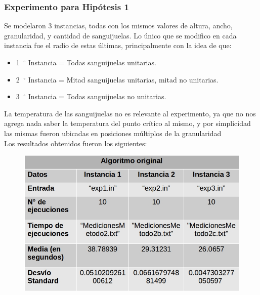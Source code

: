 \subsubsection{Experimento para Hipótesis 1}
Se modelaron 3 instancias, todas con los mismos valores de altura, ancho, granularidad, y cantidad de sanguijuelas. Lo único que se modifico en cada instancia fue el radio de estas últimas, principalmente con la idea de que:
 \begin{itemize}
    \item 1\hspace{-1.5mm}$\phantom{a}^{\circ}$ Instancia = Todas sanguijuelas unitarias.
    \item 2\hspace{-1.5mm}$\phantom{a}^{\circ}$ Instancia = Mitad sanguijuelas unitarias, mitad no unitarias.
    \item 3\hspace{-1.5mm}$\phantom{a}^{\circ}$ Instancia  = Todas sanguijuelas no unitarias.
 \end{itemize}
 La temperatura de las sanguijuelas no es relevante al experimento, ya que no nos agrega nada saber la temperatura del punto crítico al mismo, y por simplicidad las mismas fueron ubicadas en posiciones múltiplos de la granularidad \\


Los resultados obtenidos fueron los siguientes:

\begin{figure}[H]
    \centering
    \includegraphics[scale=0.6]{graphs/tablaOriginal.jpg}
    \end{figure}
        

